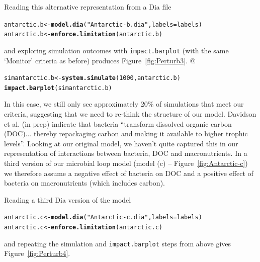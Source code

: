 \documentclass[a4paper]{article}\usepackage[]{graphicx}\usepackage[]{color}
\makeatletter
\newcommand{\hlnum}[1]{\textcolor[rgb]{0.686,0.059,0.569}{#1}}%
\newcommand{\hlstr}[1]{\textcolor[rgb]{0.192,0.494,0.8}{#1}}%
\newcommand{\hlstd}[1]{\textcolor[rgb]{0.345,0.345,0.345}{#1}}%
\newcommand{\hlkwb}[1]{\textcolor[rgb]{0.69,0.353,0.396}{#1}}%
\newcommand{\hlkwc}[1]{\textcolor[rgb]{0.333,0.667,0.333}{#1}}%
\newcommand{\hlkwd}[1]{\textcolor[rgb]{0.737,0.353,0.396}{\textbf{#1}}}%
\newenvironment{kframe}{%
 \def\at@end@of@kframe{}%
 \ifinner\ifhmode%
  \def\at@end@of@kframe{\end{minipage}}%
  \begin{minipage}{\columnwidth}%
 \fi\fi%
 \def\FrameCommand##1{\hskip\@totalleftmargin \hskip-\fboxsep
 \colorbox{shadecolor}{##1}\hskip-\fboxsep
     \hskip-\linewidth \hskip-\@totalleftmargin \hskip\columnwidth}%
 \MakeFramed {\advance\hsize-\width
   \@totalleftmargin\z@ \linewidth\hsize
   \@setminipage}}%
 {\par\unskip\endMakeFramed%
 \at@end@of@kframe}
\newenvironment{knitrout}{}{} %
\makeatother
\begin{document}
Reading this alternative representation from a Dia file
\begin{knitrout}
\color{fgcolor}\begin{kframe}
\begin{alltt}
\hlstd{antarctic.b} \hlkwb{<-} \hlkwd{model.dia}\hlstd{(}\hlstr{"Antarctic-b.dia"}\hlstd{,}\hlkwc{labels}\hlstd{=labels)}
\hlstd{antarctic.b} \hlkwb{<-} \hlkwd{enforce.limitation}\hlstd{(antarctic.b)}
\end{alltt}
\end{kframe}
\end{knitrout}
and exploring simulation outcomes with \texttt{impact.barplot} (with the same
`Monitor' criteria as before) produces Figure~\ref{fig:Perturb3}.
@
\begin{knitrout}
\color{fgcolor}\begin{kframe}
\begin{alltt}
\hlstd{simantarctic.b} \hlkwb{<-} \hlkwd{system.simulate}\hlstd{(}\hlnum{1000}\hlstd{,antarctic.b)}
\hlkwd{impact.barplot}\hlstd{(simantarctic.b)}
\end{alltt}
\end{kframe}
\end{knitrout}

In this case, we still only see approximately 20\% of simulations that meet our
criteria, suggesting that we need to re-think the structure of our model.
Davidson et al. (in prep) indicate that bacteria ``transform dissolved organic
carbon (DOC)... thereby repackaging carbon and making it available to higher
trophic levels''. Looking at our original model, we haven't quite captured this
in our representation of interactions between bacteria, DOC and macronutrients.
In a third version of our microbial loop model (model (c) --
Figure~\ref{fig:Antarctic-c}) we therefore assume a negative effect of bacteria
on DOC and a positive effect of bacteria on macronutrients (which includes carbon).

Reading a third Dia version of the model
\begin{knitrout}
\color{fgcolor}\begin{kframe}
\begin{alltt}
\hlstd{antarctic.c} \hlkwb{<-} \hlkwd{model.dia}\hlstd{(}\hlstr{"Antarctic-c.dia"}\hlstd{,}\hlkwc{labels}\hlstd{=labels)}
\hlstd{antarctic.c} \hlkwb{<-} \hlkwd{enforce.limitation}\hlstd{(antarctic.c)}
\end{alltt}
\end{kframe}
\end{knitrout}
and repeating the simulation and \texttt{impact.barplot} steps from above gives
Figure~\ref{fig:Perturb4}.
\end{document}
